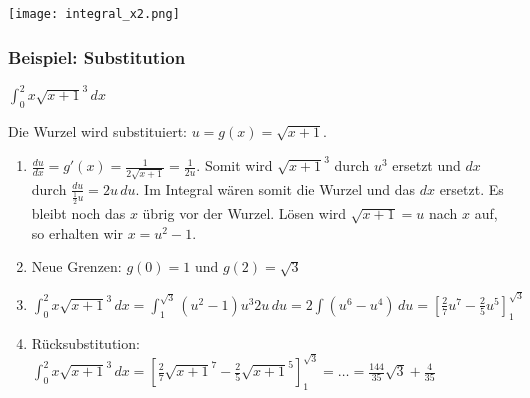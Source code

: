 \texttt{[image: integral\_x2.png]}

\subsubsection{Beispiel: Substitution}
$\int_0^2 x \sqrt{x+1}^3 \,dx$

Die Wurzel wird substituiert: $u = g(x) = \sqrt{x+1}$.

\begin{enumerate}[itemsep=0.5em]
	\item $\frac{du}{dx} = g'(x) = \frac{1}{2\sqrt{x+1}} = \frac{1}{2u}$. Somit
	wird $\sqrt{x+1}^3$ durch $u^3$ ersetzt und $dx$ durch
	$\frac{du}{\frac{1}{2}u} = 2u\,du$. Im Integral wären somit die Wurzel und das
	$dx$ ersetzt. Es bleibt noch das $x$ übrig vor der Wurzel. Lösen wird
	$\sqrt{x+1} = u$ nach $x$ auf, so erhalten wir $x = u^2 - 1$.
	\item Neue Grenzen: $g(0) = 1$ und $g(2) = \sqrt{3}$
	\item $\int_0^2 x \sqrt{x+1}^3 \,dx = \int_1^{\sqrt{3}} (u^2 - 1)u^3 2u \,du =
	2\int(u^6 -u^4) \,du = [\frac{2}{7}u^7 - \frac{2}{5}u^5]_{1}^{\sqrt{3}}$
	\item Rücksubstitution: $\int_0^2 x \sqrt{x+1}^3 \,dx =
	[\frac{2}{7}\sqrt{x+1}^7 - \frac{2}{5}\sqrt{x+1}^5]_{1}^{\sqrt{3}} = \ldots = \frac{144}{35}\sqrt{3} +
	\frac{4}{35}$
\end{enumerate}